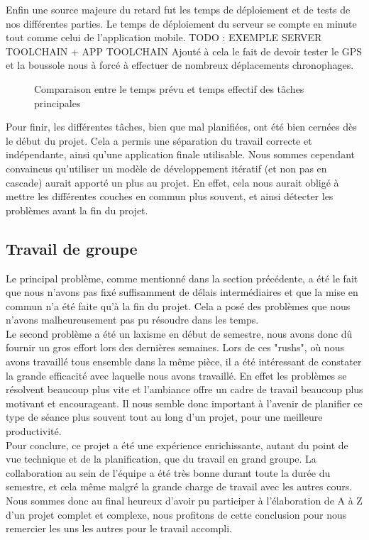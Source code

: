 \documentclass[french]{article}
\begin{document}
		Enfin une source majeure du retard fut les temps de déploiement et de tests de nos différentes parties. Le temps de déploiement du serveur se compte en minute tout comme celui de l'application mobile.
		TODO : EXEMPLE SERVER TOOLCHAIN + APP TOOLCHAIN 
		Ajouté à cela le fait de devoir tester le GPS et la boussole nous à forcé à effectuer de nombreux déplacements chronophages.
		\begin{figure}[H]
			
			\caption{Comparaison entre le temps prévu et temps effectif des tâches
				principales}
			\label{fig:comparaisonheures}
		\end{figure}
		
		Pour finir, les différentes tâches, bien que mal planifiées, ont été bien cernées dès le début du projet. Cela a permis une séparation du travail correcte et indépendante, ainsi qu'une application finale utilisable. Nous sommes cependant convaincus qu'utiliser un modèle de développement itératif (et non pas en cascade) aurait apporté un plus au projet. En effet, cela nous aurait obligé à mettre les différentes couches en commun plus souvent, et ainsi détecter les problèmes avant la fin du projet. 
		
		\subsection{Travail de groupe}
		Le principal problème, comme mentionné dans la section précédente, a été le fait que nous n'avons pas fixé suffisamment de délais intermédiaires et que la mise en commun n'a été faite qu'à la fin du projet. Cela a posé des problèmes que nous n'avons malheureusement pas pu résoudre dans les temps.\\
		
		Le second problème a été un laxisme en début de semestre, nous avons donc dû fournir un gros effort lors des dernières semaines. Lors de ces "rushs", où nous avons travaillé tous ensemble dans la même pièce, il a été intéressant de constater la grande efficacité avec laquelle nous avons travaillé. En effet les problèmes se résolvent beaucoup plus vite et l'ambiance offre un cadre de travail beaucoup plus motivant et encourageant. Il nous semble donc important à l'avenir de planifier ce type de séance plus souvent tout au long d'un projet, pour une meilleure productivité.\\
		
		Pour conclure, ce projet a été une expérience enrichissante, autant du point de vue technique et de la planification, que du travail en grand groupe. La collaboration au sein de l'équipe a été très bonne durant toute la durée du semestre, et cela même malgré la grande charge de travail avec les autres cours. Nous sommes donc au final heureux d'avoir pu participer à l'élaboration de A à Z d'un projet complet et complexe, nous profitons de cette conclusion pour nous remercier les uns les autres pour le travail accompli.
		
\end{document}
